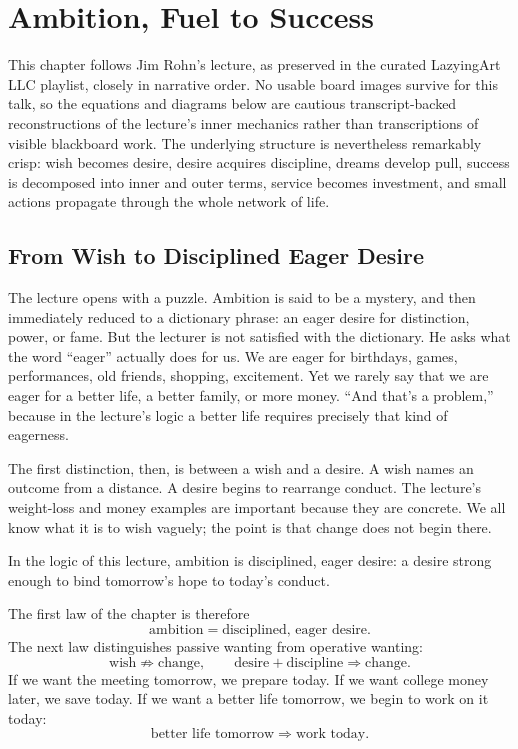 \chapter{Ambition, Fuel to Success}

This chapter follows Jim Rohn's lecture, as preserved in the curated LazyingArt LLC playlist, closely in narrative order. No usable board images survive for this talk, so the equations and diagrams below are cautious transcript-backed reconstructions of the lecture's inner mechanics rather than transcriptions of visible blackboard work. The underlying structure is nevertheless remarkably crisp: wish becomes desire, desire acquires discipline, dreams develop pull, success is decomposed into inner and outer terms, service becomes investment, and small actions propagate through the whole network of life.

\section{From Wish to Disciplined Eager Desire}

The lecture opens with a puzzle. Ambition is said to be a mystery, and then immediately reduced to a dictionary phrase: an eager desire for distinction, power, or fame. But the lecturer is not satisfied with the dictionary. He asks what the word ``eager'' actually does for us. We are eager for birthdays, games, performances, old friends, shopping, excitement. Yet we rarely say that we are eager for a better life, a better family, or more money. ``And that's a problem,'' because in the lecture's logic a better life requires precisely that kind of eagerness.

The first distinction, then, is between a wish and a desire. A wish names an outcome from a distance. A desire begins to rearrange conduct. The lecture's weight-loss and money examples are important because they are concrete. We all know what it is to wish vaguely; the point is that change does not begin there.

\begin{definition}
In the logic of this lecture, ambition is disciplined, eager desire: a desire strong enough to bind tomorrow's hope to today's conduct.
\end{definition}

The first law of the chapter is therefore
\begin{equation}
\text{ambition}=\text{disciplined, eager desire}.
\end{equation}
The next law distinguishes passive wanting from operative wanting:
\begin{equation}
\text{wish} \not\Rightarrow \text{change},
\qquad
\text{desire}+\text{discipline}\Rightarrow \text{change}.
\end{equation}
If we want the meeting tomorrow, we prepare today. If we want college money later, we save today. If we want a better life tomorrow, we begin to work on it today:
\begin{equation}
\text{better life tomorrow} \Rightarrow \text{work today}.
\end{equation}

